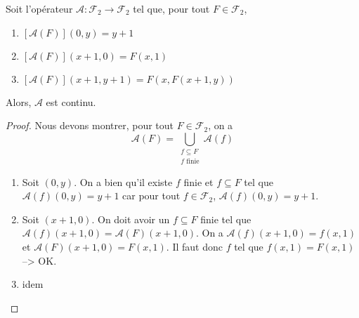 

\begin{proposition}
	\label{proposition:operateur_ackermann}
	Soit l'opérateur $\mathcal{A} : \mathcal{F}_{2} \rightarrow \mathcal{F}_{2}$
	tel que, pour tout $F \in \mathcal{F}_{2}$,
	\begin{enumerate}
		\item $[\mathcal{A}(F)] (0, y) = y + 1$
		\item $[\mathcal{A}(F)] (x + 1, 0) = F(x, 1)$
		\item $[\mathcal{A}(F)] (x + 1, y + 1) = F(x, F(x + 1, y))$
	\end{enumerate}

	Alors, $\mathcal{A}$ est continu.
\end{proposition}


\ifdefined\outputproof
\begin{proof}
	Nous devons montrer, pour tout $F \in \mathcal{F}_{2}$, on a
	\begin{equation}
		\mathcal{A}(F) = \displaystyle \bigcup_{\substack{f \subseteq
			F \\ f \text{ finie}}} \mathcal{A}(f)
	\end{equation}

	\begin{enumerate}
		\item Soit $(0, y)$. On a bien qu'il existe $f$ finie et $f \subseteq
			F$ tel que $\mathcal{A}(f)(0, y) = y + 1$ car pour tout $f \in
			\mathcal{F}_{2}$, $\mathcal{A}(f)(0, y) = y + 1$.
		\item Soit $(x + 1, 0)$. On doit avoir un $f \subseteq F$ finie tel que
			$\mathcal{A}(f)(x + 1, 0) = \mathcal{A}(F)(x + 1, 0)$. On a $\mathcal{A}(f)(x + 1,
			0) = f(x, 1)$ et $\mathcal{A}(F)(x + 1, 0) = F(x, 1)$.
			Il faut donc $f$ tel que $f(x, 1) = F(x, 1)$ --> OK.
		\item idem
	\end{enumerate}
\end{proof}
\fi

